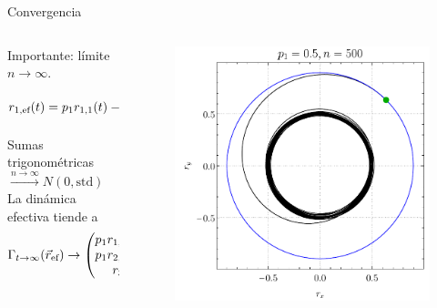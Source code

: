 \begin{frame}{Convergencia}
    \begin{columns}
        \begin{column}{0.5\textwidth}
            Importante: límite $n\rightarrow\infty$. \pause
            \begin{equation}
                r_{1,\text{ef}}(t)=p_{1}r_{1,1}(t)-p_{\text{np}}r_{\text{np}}\sum_{k=2}^{n}\sin(2\omega_{k} t-\phi)\nonumber
            \end{equation}\pause
            Sumas trigonométricas $\xrightarrow{n\rightarrow\infty} N(0,\text{std})$ \pause \\
            \vspace{0.3cm}
            La dinámica efectiva tiende a\pause  \\
\begin{equation}\label{eq:MeanDynamics}
    \Gamma_{t\rightarrow\infty}(\vec{r}_{\text{ef}})\rightarrow\begin{pmatrix}
        p_{1}r_{1,1}(t)\\
        p_{1}r_{2,1}(t)\\
        r_{3}\\
    \end{pmatrix}\nonumber.
\end{equation}
        \end{column}
        \pause
        \begin{column}{0.5\textwidth}
           \begin{figure}
            \centering
            \includegraphics[width=1.\textwidth]{figures/maxent_results/local_all_ran_p=0.5_r=0.9_n=500_a=-3_b=3.pdf}
           \end{figure}
        \end{column}
    \end{columns}
\end{frame}
